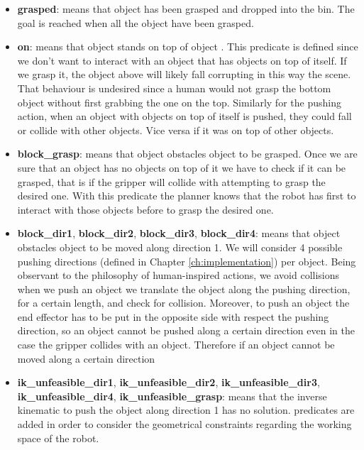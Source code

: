 \begin{itemize}
\item \textbf{grasped}:  means that object  has been grasped and dropped into the bin. The goal is reached when all the object have been grasped. 
\item \textbf{on}: means that object  stands on top of object . This predicate is defined since we don't want to interact with an object that has objects on top of itself. If we  grasp it, the object above will likely fall corrupting in this way the scene. That behaviour is undesired since a human would not grasp the bottom object without first grabbing the one on the top. Similarly for the pushing action, when an object with objects on top of itself is pushed, they could fall or collide with other objects. Vice versa if it was on top of other objects.
\item \textbf{block\_grasp}:  means that object  obstacles  object  to be grasped. 
Once we are sure that an object has no objects on top of it we have to check if it can be grasped, that is if the gripper will collide with  attempting to grasp the desired one. With this predicate the planner knows that the robot has first to interact with those objects before to grasp the desired one.
\item \textbf{block\_dir1}, \textbf{block\_dir2}, \textbf{block\_dir3}, \textbf{block\_dir4}:  means that object  obstacles  object  to be moved along direction 1. We will consider 4 possible pushing directions (defined in Chapter \ref{ch:implementation}) per object. Being observant to the philosophy  of human-inspired actions, we avoid collisions when we push an object we translate the object along the pushing direction, for a certain length, and check for collision. Moreover, to push an object the end effector has to be put in the opposite side with respect the pushing direction, so an object cannot be pushed along a certain direction even in the case the gripper collides with an object.
Therefore if an object cannot be moved along a certain direction 
\item \textbf{ik\_unfeasible\_dir1}, \textbf{ik\_unfeasible\_dir2}, \textbf{ik\_unfeasible\_dir3}, \textbf{ik\_unfeasible\_dir4}, \textbf{ik\_unfeasible\_grasp}:  means that the inverse kinematic to push the object  along direction 1 has no solution.   predicates are added in order to consider the geometrical constraints regarding the working space of the robot.
\end{itemize}

